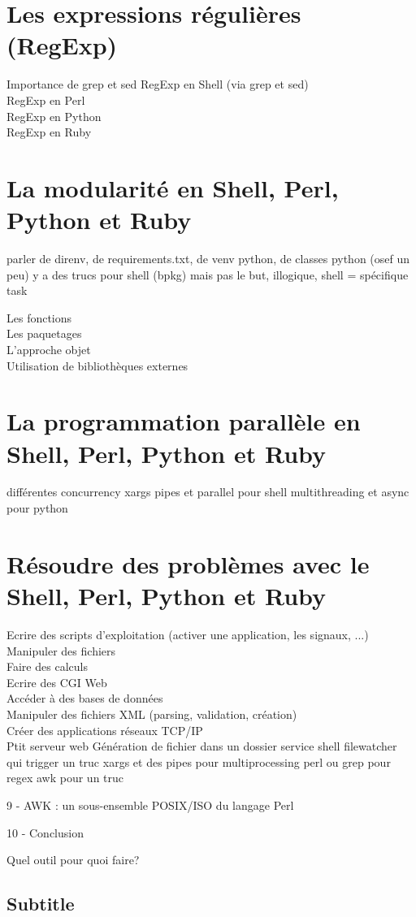 \documentclass[11pt,a4paper]{article}
\begin{document}
\section{Les expressions régulières (RegExp)}
Importance de grep et sed 
RegExp en Shell (via grep et sed)\\
RegExp en Perl\\
RegExp en Python\\
RegExp en Ruby\\

\section{La modularité en Shell, Perl, Python et Ruby}

parler de direnv, de requirements.txt, de venv python, de classes python (osef un peu)
y a des trucs pour shell (bpkg) mais pas le but, illogique, shell = spécifique task

Les fonctions\\
Les paquetages\\
L'approche objet\\
Utilisation de bibliothèques externes\\



\section{La programmation parallèle en Shell, Perl, Python et Ruby}

différentes concurrency
xargs pipes et parallel pour shell
multithreading et async pour python

\section{Résoudre des problèmes avec le Shell, Perl, Python et Ruby}

Ecrire des scripts d'exploitation (activer une application, les signaux, ...)\\
Manipuler des fichiers\\
Faire des calculs\\
Ecrire des CGI Web\\
Accéder à des bases de données\\
Manipuler des fichiers XML (parsing, validation, création)\\
Créer des applications réseaux TCP/IP\\

Ptit serveur web
Génération de fichier dans un dossier
service shell filewatcher qui trigger un truc
xargs et des pipes pour multiprocessing
perl ou grep pour regex
awk pour un truc

9 - AWK : un sous-ensemble POSIX/ISO du langage Perl

10 - Conclusion

Quel outil pour quoi faire?



\subsection*{Subtitle}
\end{document}
